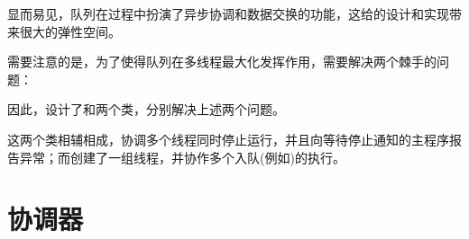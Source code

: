 \begin{content}
显而易见，队列在过程中扮演了异步协调和数据交换的功能，这给的设计和实现带来很大的弹性空间。

需要注意的是，为了使得队列在多线程最大化发挥作用，需要解决两个棘手的问题：

\begin{enum}
\end{enum}

因此，设计了和两个类，分别解决上述两个问题。

这两个类相辅相成，协调多个线程同时停止运行，并且向等待停止通知的主程序报告异常；而创建了一组线程，并协作多个入队(例如)的执行。

\end{content}

\section{协调器}

